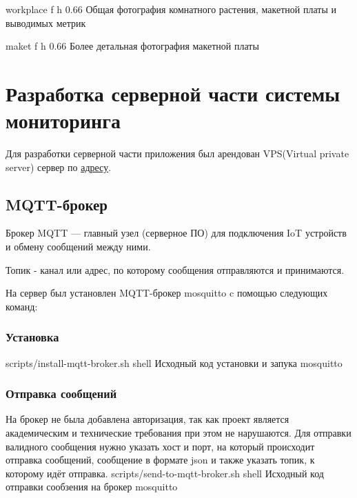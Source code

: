 \documentclass{bmstu}
\begin{document}
        {workplace} %
        {f} %
        {h} %
        {0.66\textwidth} %
        {Общая фотография комнатного растения, макетной платы и выводимых метрик} %

        {maket} %
        {f} %
        {h} %
        {0.66\textwidth} %
        {Более детальная фотография макетной платы} %

    \section{Разработка серверной части системы мониторинга}
    Для разработки серверной части приложения был арендован VPS(Virtual private server) сервер по \href{http://vm4481772.25ssd.had.wf:3000/d/ce3f4anwhavpce/plant-monitoring?from=now-15m&to=now&timezone=browser}{адресу}.

    \subsection{MQTT-брокер}
    Брокер MQTT — главный узел (серверное ПО) для подключения IoT устройств и обмену сообщений между ними.

    Топик - канал или адрес, по которому сообщения отправляются и принимаются.

    На сервер был установлен MQTT-брокер mosquitto \cite{ndunguInstallMosquittoMQTT}  c помощью следующих команд:

    \subsubsection{Установка}
        {scripts/install-mqtt-broker.sh} %
        {shell}
        {Исходный код установки и запука mosquitto} %

    \subsubsection{Отправка сообщений}
    На брокер не была добавлена авторизация, так как проект является академическим и технические требования при этом не нарушаются.
    Для отправки валидного сообщения нужно указать хост и порт, на который происходит отправка сообщений,
    сообщение в формате json и также указать топик, к которому идёт отправка.
        {scripts/send-to-mqtt-broker.sh} %
        {shell}
        {Исходный код отправки сообзения на брокер mosquitto} %
    
\end{document}
